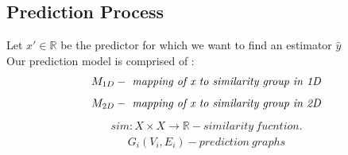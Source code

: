 \documentclass[a4paper]{article}
\begin{document}
\subsection{Prediction Process}
Let 
$x' \in \mathbb{R}$  be  the predictor for which we want to find an estimator $\hat{y}$\\
Our prediction model is comprised of :
\begin{align*}
M_{1D} -\text{\emph{ mapping of x to similarity group in 1D}}
\end{align*}
\begin{align*}
M_{2D} -\text{\emph{ mapping of x to similarity group in 2D}}
\end{align*}
\begin{align*}
sim:X \times X \rightarrow \mathbb{R} - similarity\ fucntion.
\end{align*}
\begin{align*}
G_i(V_i,E_i) - prediction\ graphs
\end{align*}
\end{document}
